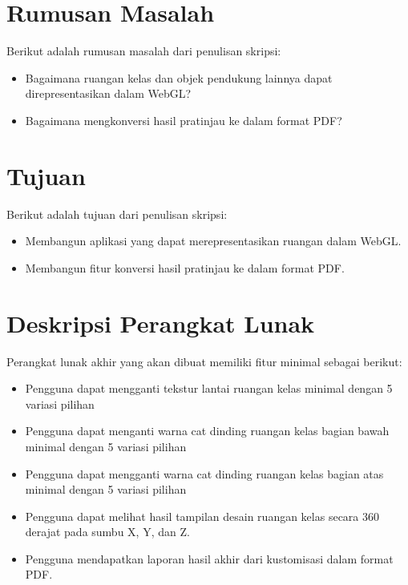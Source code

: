 \documentclass[a4paper,twoside]{article}
\begin{document}
\section{Rumusan Masalah}
Berikut adalah rumusan masalah dari penulisan skripsi:
\begin{itemize}
	\item Bagaimana ruangan kelas dan objek pendukung lainnya dapat direpresentasikan dalam WebGL?
	\item Bagaimana mengkonversi hasil pratinjau ke dalam format PDF?
\end{itemize}


\section{Tujuan}
Berikut adalah tujuan dari penulisan skripsi:
\begin{itemize}
	\item Membangun aplikasi yang dapat merepresentasikan ruangan dalam WebGL.
	\item Membangun fitur konversi hasil pratinjau ke dalam format PDF.
\end{itemize}

\section{Deskripsi Perangkat Lunak}
Perangkat lunak akhir yang akan dibuat memiliki fitur minimal sebagai berikut:
\begin{itemize}
	\item Pengguna dapat mengganti tekstur lantai ruangan kelas minimal dengan 5 variasi pilihan
	\item Pengguna dapat menganti warna cat dinding ruangan kelas bagian bawah minimal dengan 5 variasi pilihan
	\item Pengguna dapat mengganti warna cat dinding ruangan kelas bagian atas minimal dengan 5 variasi pilihan
	\item Pengguna dapat melihat hasil tampilan desain ruangan kelas secara 360 derajat pada sumbu X, Y, dan Z. 
	\item Pengguna mendapatkan laporan hasil akhir dari kustomisasi dalam format PDF.
\end{itemize}
\end{document}
